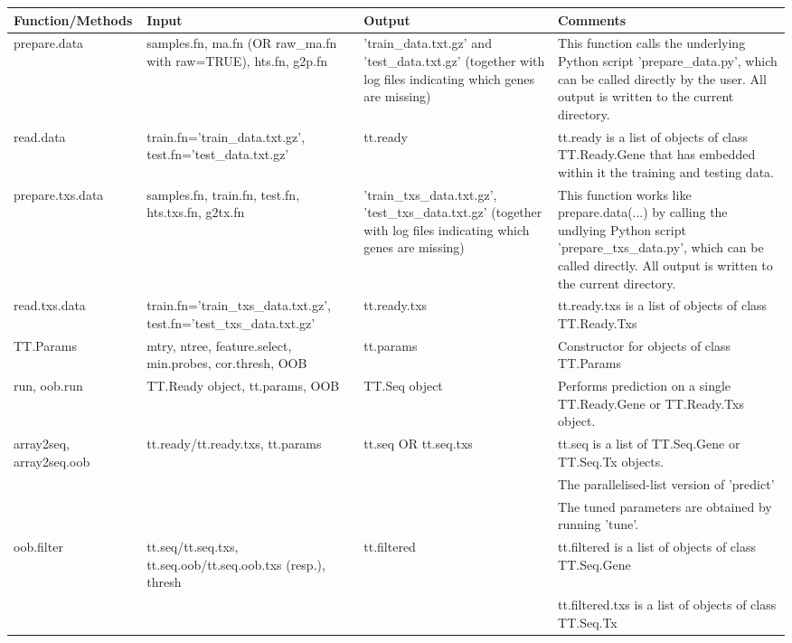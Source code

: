 \documentclass[a4paper,12pt]{article}
\begin{document}
\begin{table}[H]
\scriptsize
\centering
\begin{tabular}{|p{2.5cm}|p{4cm}|p{4cm}|p{5cm}|}
\hline
\textbf{Function/Methods} & \textbf{Input} & \textbf{Output} & \textbf{Comments} \\
\hline
prepare.data & samples.fn, ma.fn (OR raw\_ma.fn with raw=TRUE), hts.fn, g2p.fn & 'train\_data.txt.gz' and 'test\_data.txt.gz'  (together with log files indicating which genes are missing) & This function calls the underlying Python script 'prepare\_data.py', which can be called directly by the user. All output is written to the current directory. \\
\hline
read.data & train.fn='train\_data.txt.gz', test.fn='test\_data.txt.gz' & tt.ready & tt.ready is a list of objects of class TT.Ready.Gene that has embedded within it the training and testing data. \\
\hline
prepare.txs.data & samples.fn, train.fn, test.fn, hts.txs.fn, g2tx.fn & 'train\_txs\_data.txt.gz', 'test\_txs\_data.txt.gz' (together with log files indicating which genes are missing) & 
This function works like prepare.data(...) by calling the undlying Python script 'prepare\_txs\_data.py', which can be called directly. All output is written to the current directory. \\
\hline
read.txs.data & train.fn='train\_txs\_data.txt.gz', test.fn='test\_txs\_data.txt.gz' & tt.ready.txs & tt.ready.txs is a list of objects of class TT.Ready.Txs \\
\hline
TT.Params & mtry, ntree, feature.select, min.probes, cor.thresh, OOB & tt.params & Constructor for objects of class TT.Params \\
\hline
run, oob.run & TT.Ready object, tt.params, OOB & TT.Seq object & Performs prediction on a single TT.Ready.Gene or TT.Ready.Txs object. \\
\hline
array2seq, array2seq.oob & tt.ready/tt.ready.txs, tt.params & tt.seq OR tt.seq.txs & tt.seq is a list of TT.Seq.Gene or TT.Seq.Tx objects. \\
 & & & The parallelised-list version of 'predict' \\
 & & & The tuned parameters are obtained by running 'tune'. \\
\hline
oob.filter & tt.seq/tt.seq.txs, tt.seq.oob/tt.seq.oob.txs (resp.), thresh & tt.filtered & tt.filtered is a list of objects of class TT.Seq.Gene \\
 & & & tt.filtered.txs is a list of objects of class TT.Seq.Tx \\

\end{tabular}
\end{table}
\end{document}

